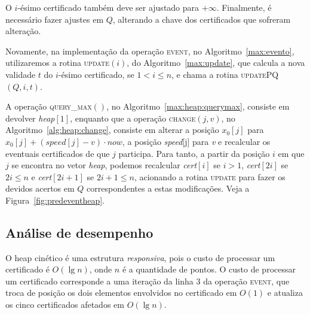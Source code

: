 

O $i$-ésimo certificado também deve ser ajustado para $+\infty$.
Finalmente, é necessário fazer ajustes em $Q$, alterando a chave dos certificados que sofreram
alteração.

%

Novamente, na implementação da operação \textsc{event}, no Algoritmo~\ref{max:evento},
utilizaremos a rotina \textsc{update}$(i)$, do Algoritmo~\ref{max:update}, que calcula a nova
validade $t$ do $i$-ésimo certificado, se $1 < i \leq n$, e chama a rotina \textsc{updatePQ}$(Q, i,
t)$.





A operação \textsc{query\_max}$()$, no Algoritmo~\ref{max:heap:querymax},
consiste em devolver \textit{heap}$[1]$, enquanto que a operação
\textsc{change}$(j, v)$, no Algoritmo~\ref{alg:heap:change}, consiste em alterar
a posição $x_0[j]$ para ${x_0[j] + (\mathit{speed}[j] - v)\cdot now}$, a posição
\textit{speed}[j] para \textit{v} e recalcular os eventuais certificados de que
$j$ participa.
Para tanto, a partir da posição $i$ em que $j$ se encontra no vetor \textit{heap}, podemos
recalcular \textit{cert}$[i]$ se $i > 1$, \textit{cert}$[2i]$ se $2i \leq n$ e \textit{cert}$[2i +
1]$ se $2i + 1 \leq n$, acionando a rotina \textsc{update} para fazer os devidos acertos em $Q$
correspondentes a estas modificações.
Veja a Figura~\ref{fig:predeventheap}.







\FloatBarrier

\subsection{Análise de desempenho}\label{subsec:heap:analise-de-desempenho}

O heap cinético é uma estrutura \textit{responsiva}, pois o custo de processar
um certificado é $O(\lg{n})$, onde $n$ é a quantidade de pontos.
O custo de processar um certificado corresponde a uma iteração da linha $3$ da operação
\textsc{event}, que troca de posição os dois elementos envolvidos no certificado em $O(1)$ e
atualiza os cinco certificados afetados em $O(\lg{n})$.

